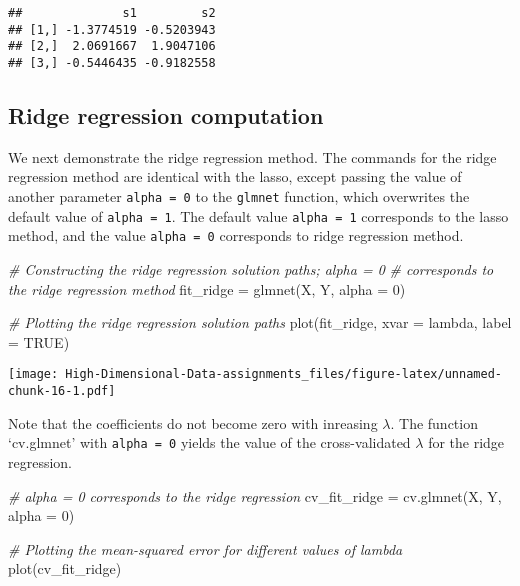 \documentclass[
]{book}
\newenvironment{Shaded}{\begin{snugshade}}{\end{snugshade}}
\newcommand{\AttributeTok}[1]{\textcolor[rgb]{0.77,0.63,0.00}{#1}}
\newcommand{\CommentTok}[1]{\textcolor[rgb]{0.56,0.35,0.01}{\textit{#1}}}
\newcommand{\ConstantTok}[1]{\textcolor[rgb]{0.00,0.00,0.00}{#1}}
\newcommand{\DecValTok}[1]{\textcolor[rgb]{0.00,0.00,0.81}{#1}}
\newcommand{\FunctionTok}[1]{\textcolor[rgb]{0.00,0.00,0.00}{#1}}
\newcommand{\NormalTok}[1]{#1}
\newcommand{\OtherTok}[1]{\textcolor[rgb]{0.56,0.35,0.01}{#1}}
\newcommand{\StringTok}[1]{\textcolor[rgb]{0.31,0.60,0.02}{#1}}
\begin{document}
\begin{verbatim}
##              s1         s2
## [1,] -1.3774519 -0.5203943
## [2,]  2.0691667  1.9047106
## [3,] -0.5446435 -0.9182558
\end{verbatim}

\hypertarget{ridge-computation}{%
\subsection{Ridge regression computation}\label{ridge-computation}}

We next demonstrate the ridge regression method. The commands for the ridge regression method are identical with the lasso, except passing the value of another parameter \texttt{alpha\ =\ 0} to the \texttt{glmnet} function, which overwrites the default value of \texttt{alpha\ =\ 1}. The default value \texttt{alpha\ =\ 1} corresponds to the lasso method, and the value \texttt{alpha\ =\ 0} corresponds to ridge regression method.

\begin{Shaded}
\begin{Highlighting}[]
\CommentTok{\# Constructing the ridge regression solution paths; \textquotesingle{}alpha = 0\textquotesingle{}}
\CommentTok{\# corresponds to the ridge regression method}
\NormalTok{fit\_ridge }\OtherTok{=} \FunctionTok{glmnet}\NormalTok{(X, Y, }\AttributeTok{alpha =} \DecValTok{0}\NormalTok{)}

\CommentTok{\# Plotting the ridge regression solution paths}
\FunctionTok{plot}\NormalTok{(fit\_ridge, }\AttributeTok{xvar =} \StringTok{\textquotesingle{}lambda\textquotesingle{}}\NormalTok{, }\AttributeTok{label =} \ConstantTok{TRUE}\NormalTok{)}
\end{Highlighting}
\end{Shaded}

\texttt{[image: High-Dimensional-Data-assignments\_files/figure-latex/unnamed-chunk-16-1.pdf]}

Note that the coefficients do not become zero with inreasing \(\lambda\). The function `cv.glmnet' with \texttt{alpha\ =\ 0} yields the value of the cross-validated \(\lambda\) for the ridge regression.

\begin{Shaded}
\begin{Highlighting}[]
\CommentTok{\# \textquotesingle{}alpha = 0\textquotesingle{} corresponds to the ridge regression}
\NormalTok{cv\_fit\_ridge }\OtherTok{=} \FunctionTok{cv.glmnet}\NormalTok{(X, Y, }\AttributeTok{alpha =} \DecValTok{0}\NormalTok{)}

\CommentTok{\# Plotting the mean{-}squared error for different values of lambda}
\FunctionTok{plot}\NormalTok{(cv\_fit\_ridge)}
\end{Highlighting}
\end{Shaded}
\end{document}
